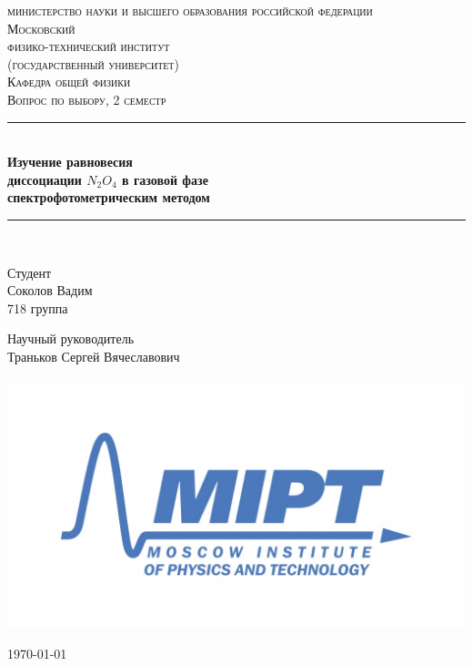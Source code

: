 \documentclass[a4paper,12pt]{article} %
\newenvironment{bottompar}{\par\vspace*{\fill}}{\clearpage}
\begin{document}


\begin{titlepage}
\newcommand{\HRule}{\rule{\linewidth}{0.5mm}} %

\center %
 
\textsc{\LARGE министерство науки и высшего образования российской федерации\\[0.1cm]
\Large Московский\\[-0.2cm]физико-технический институт\\[0.1cm]\large (государственный университет)}\\[1.5cm] %
\textsc{\Large Кафедра общей физики}\\[0.2cm] %
\textsc{\large Вопрос по выбору, 2 семестр}\\[0.5cm] %

\HRule
\\[0.1cm]
{ \large \bfseries Изучение равновесия 
\\[0.0cm] диссоциации  \(N_2O_4\) в газовой фазе \\[0.1cm] спектрофотометрическим методом} %
\HRule
\\[1.5cm]

\begin{flushleft} \large
	\textsf{Студент}\\[0.1cm]
	Соколов Вадим \\
	718 группа
	
	\textsf{Научный руководитель}\\[0.1cm]
	Траньков Сергей Вячеславович	
	
\end{flushleft}


\begin{bottompar}
	\begin{center}
		\includegraphics[width = 70 mm]{logo.jpg}
	\end{center}
	{\large \today}

\end{bottompar}
\vfill
\end{titlepage}
\end{document}

